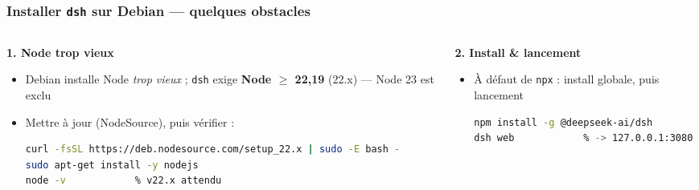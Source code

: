 \documentclass[
	11pt,
	aspectratio=169
]{beamer}
\begin{document}
\begin{frame}[fragile]
    \frametitle{Installer \texttt{dsh} sur Debian --- quelques obstacles}
    \begin{columns}[t]
        \begin{column}{0.5\textwidth}
            \begin{block}{\centering \textbf{1. Node trop vieux}}
                \begin{itemize}\setlength\itemsep{0.2em}
                    \item Debian installe Node \emph{trop vieux} ; \texttt{dsh} exige \textbf{Node $\ge$ 22{,}19} (22.x) --- Node 23 est exclu
                    \item Mettre à jour (NodeSource), puis vérifier :
                    \begin{lstlisting}[language=bash, basicstyle=\ttfamily\scriptsize, aboveskip=0pt, belowskip=0pt]
curl -fsSL https://deb.nodesource.com/setup_22.x | sudo -E bash -
sudo apt-get install -y nodejs
node -v            % v22.x attendu
\end{lstlisting}
                \end{itemize}
            \end{block}
        \end{column}
        \begin{column}{0.46\textwidth}
            \begin{exampleblock}{\footnotesize \centering \textbf{2. Install \& lancement}}
                \begin{itemize}\setlength\itemsep{0.2em}
                    \item À défaut de \texttt{npx} : install globale, puis lancement
                    \begin{lstlisting}[language=bash, basicstyle=\ttfamily\scriptsize, aboveskip=0pt, belowskip=0pt]
npm install -g @deepseek-ai/dsh
dsh web            % -> 127.0.0.1:3080
\end{lstlisting}
                \end{itemize}
            \end{exampleblock}
        \end{column}
    \end{columns}
\end{frame}
\end{document}
